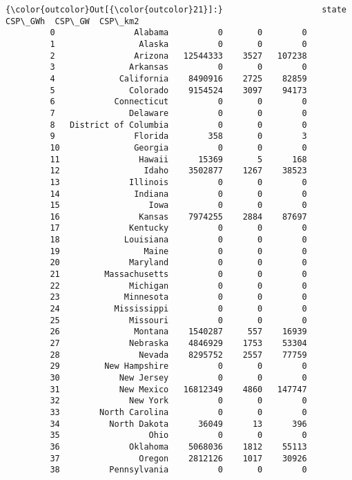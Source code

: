 \documentclass[11pt]{article}
\begin{document}
\begin{Verbatim}[commandchars=\\\{\}]
{\color{outcolor}Out[{\color{outcolor}21}]:}                    state    CSP\_GWh  CSP\_GW  CSP\_km2
         0                Alabama          0       0        0
         1                 Alaska          0       0        0
         2                Arizona   12544333    3527   107238
         3               Arkansas          0       0        0
         4             California    8490916    2725    82859
         5               Colorado    9154524    3097    94173
         6            Connecticut          0       0        0
         7               Delaware          0       0        0
         8   District of Columbia          0       0        0
         9                Florida        358       0        3
         10               Georgia          0       0        0
         11                Hawaii      15369       5      168
         12                 Idaho    3502877    1267    38523
         13              Illinois          0       0        0
         14               Indiana          0       0        0
         15                  Iowa          0       0        0
         16                Kansas    7974255    2884    87697
         17              Kentucky          0       0        0
         18             Louisiana          0       0        0
         19                 Maine          0       0        0
         20              Maryland          0       0        0
         21         Massachusetts          0       0        0
         22              Michigan          0       0        0
         23             Minnesota          0       0        0
         24           Mississippi          0       0        0
         25              Missouri          0       0        0
         26               Montana    1540287     557    16939
         27              Nebraska    4846929    1753    53304
         28                Nevada    8295752    2557    77759
         29         New Hampshire          0       0        0
         30            New Jersey          0       0        0
         31            New Mexico   16812349    4860   147747
         32              New York          0       0        0
         33        North Carolina          0       0        0
         34          North Dakota      36049      13      396
         35                  Ohio          0       0        0
         36              Oklahoma    5068036    1812    55113
         37                Oregon    2812126    1017    30926
         38          Pennsylvania          0       0        0

\end{Verbatim}
\end{document}
